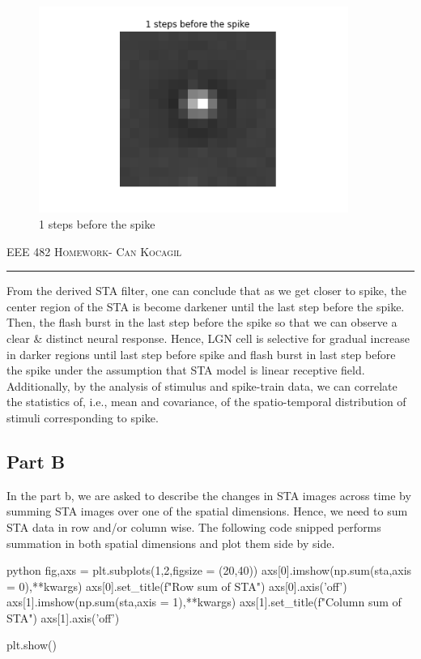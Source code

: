 \documentclass[12pt]{amsart}
\begin{document}
\begin{figure}[h]
    \centering
    \includegraphics[width = 0.9\textwidth]{images/1.png}
    \caption{1 steps before the spike}
\end{figure}


\newpage
{\scshape EEE 482} \hfill {\scshape \large  Homework-\relax} \hfill {\scshape Can Kocagil}
\smallskip
\hrule
\vspace{2mm}


From the derived STA filter, one can conclude that as we get closer to spike, the center region of the STA is become darkener until the last step before the spike. Then, the flash burst in the last step before the spike so that we can observe a clear \& distinct neural response. Hence, LGN cell is selective for gradual increase in darker regions until last step before spike and flash burst in last step before the spike under the assumption that STA model is linear receptive field. Additionally, by the analysis of stimulus and spike-train data, we can correlate the statistics of, i.e., mean and covariance, of the spatio-temporal distribution of stimuli corresponding to spike.


\subsection{Part B}

In the part b, we are asked to describe the changes in STA images across time by summing STA images over one of the spatial dimensions. Hence, we need to sum STA data in row and/or column wise. The following code snipped performs summation in both spatial dimensions and plot them side by side.

\begin{mintedbox}{python}
fig,axs = plt.subplots(1,2,figsize = (20,40)) 
axs[0].imshow(np.sum(sta,axis = 0),**kwargs)
axs[0].set_title(f"Row sum of STA")
axs[0].axis('off')
axs[1].imshow(np.sum(sta,axis = 1),**kwargs)
axs[1].set_title(f"Column sum of STA")
axs[1].axis('off')

plt.show()
\end{mintedbox}
\end{document}
